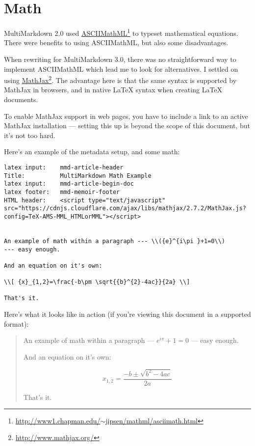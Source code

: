\section{Math }
\label{math}

MultiMarkdown 2.0 used \href{http://www1.chapman.edu/~jipsen/mathml/asciimath.html}{ASCIIMathML}\footnote{\href{http://www1.chapman.edu/~jipsen/mathml/asciimath.html}{http:\slash \slash www1.chapman.edu\slash \ensuremath{\sim}jipsen\slash mathml\slash asciimath.html}} to typeset mathematical equations. There
were benefits to using ASCIIMathML, but also some disadvantages.

When rewriting for MultiMarkdown 3.0, there was no straightforward way to
implement ASCIIMathML which lead me to look for alternatives. I settled on
using \href{http://www.mathjax.org/}{MathJax}\footnote{\href{http://www.mathjax.org/}{http:\slash \slash www.mathjax.org\slash }}. The advantage here is that the same syntax is supported by
MathJax in browsers, and in native LaTeX syntax when creating LaTeX documents.

To enable MathJax support in web pages, you have to include a link to an
active MathJax installation --- setting this up is beyond the scope of this
document, but it's not too hard.

Here's an example of the metadata setup, and some math:

\begin{verbatim}
latex input:	mmd-article-header  
Title:			MultiMarkdown Math Example  
latex input:	mmd-article-begin-doc  
latex footer:	mmd-memoir-footer  
HTML header:	<script type="text/javascript" src="https://cdnjs.cloudflare.com/ajax/libs/mathjax/2.7.2/MathJax.js?config=TeX-AMS-MML_HTMLorMML"></script>

		
An example of math within a paragraph --- \\({e}^{i\pi }+1=0\\)
--- easy enough.

And an equation on it's own:

\\[ {x}_{1,2}=\frac{-b\pm \sqrt{{b}^{2}-4ac}}{2a} \\]

That's it.
\end{verbatim}

Here's what it looks like in action (if you're viewing this document in a
supported format):

\begin{quote}
An example of math within a paragraph --- \({e}^{i\pi }+1=0\)
--- easy enough.

And an equation on it's own:

\[ {x}_{1,2}=\frac{-b\pm \sqrt{{b}^{2}-4ac}}{2a} \]

That's it.
\end{quote}

